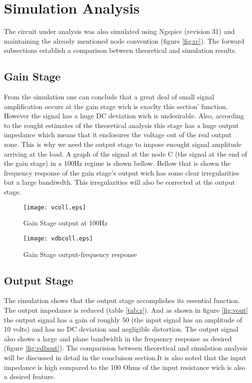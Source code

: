 \section{Simulation Analysis}
\label{sec:simulation}

The circuit under analysis was also simulated using Ngspice (revision 31) and maintaining the already mentioned node convention (figure \ref{fig:rc}). The forward subsections establish a comparison between theoretical and simulation results.

\subsection{Gain Stage}
From the simulation one can conclude that a great deal of small signal amplification occurs at the gain stage wich is exaclty this section' function. However the signal has a huge DC deviation wich is undesirable. Also, according to the rought estimates of the theoretical analysis this stage has a huge output impedance which means that it enclosures the voltage out of the real output zone. This is why we need the output stage to impose enought signal amplitude arriving at the load. A graph of the signal at the node C (the signal at the end of the gain stage) in a 100Hz regime is shown bellow. Bellow that is shown the frequency response of the gain stage's output wich has some clear irregularities but a large bandiwdth. This irregularities will also be corrected at the output stage.

\begin{figure}[h] \centering
\texttt{[image: vcoll.eps]}
\vspace{-5mm}
\caption{Gain Stage output at 100Hz}
\label{fig:vcoll}
\end{figure}

\begin{figure}[h] \centering
\texttt{[image: vdbcoll.eps]}
\vspace{-5mm}
\caption{Gain Stage output-frequency response}
\label{fig:vdbcoll}
\end{figure}

\newpage
\subsection{Output Stage}
The simulation shows that the output stage accomplishes its essential function. The output impedance is reduced (table \ref{tab:z}). And as shown in figure \ref{fig:vout} the output signal has a gain of roughly 50 (the input signal has an amplitude of 10 volts) and has no DC deviation and negligible distortion. The output signal also shows a large and plane bandwidth in the frequency response as desired (figure \ref{fig:vdbout}). The comparision between theoretical and simulation analysis will be discussed in detail in the concluison section.It is also noted that the input impedance is high compared to the 100 Ohms of the input resistance wich is also a desired feature.



